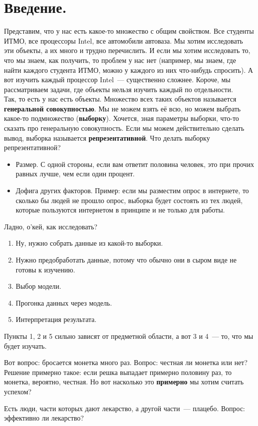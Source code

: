 \documentclass{article}
\begin{document}
    \section{Введение.}
    \begin{remark}
        Представим, что у нас есть какое-то множество с общим свойством. Все студенты ИТМО, все процессоры Intel, все автомобили автоваза. Мы хотим исследовать эти объекты, а их много и трудно перечислить. И если мы хотим исследовать то, что мы знаем, как получить, то проблем у нас нет (например, мы знаем, где найти каждого студента ИТМО, можно у каждого из них что-нибудь спросить). А вот изучить каждый процессор Intel~--- существенно сложнее. Короче, мы рассматриваем задачи, где объекты нельзя изучить каждый по отдельности.\\
        Так, то есть у нас есть объекты. Множество всех таких объектов называется \textbf{генеральной совокупностью}. Мы не можем взять её всю, но можем выбрать какое-то подмножество (\textbf{выборку}). Хочется, зная параметры выборки, что-то сказать про генеральную совокупность. Если мы можем действительно сделать вывод, выборка называется \textbf{репрезентативной}. Что делать выборку репрезентативной?
        \begin{itemize}
            \item Размер. С одной стороны, если вам ответит половина человек, это при прочих равных лучше, чем если один процент.
            \item Дофига других факторов. Пример: если мы разместим опрос в интернете, то сколько бы людей не прошло опрос, выборка будет состоять из тех людей, которые пользуются интернетом в принципе и не только для работы.
        \end{itemize}
        Ладно, о'кей, как исследовать?
        \begin{enumerate}
            \item Ну, нужно собрать данные из какой-то выборки.
            \item Нужно предобработать данные, потому что обычно они в сыром виде не готовы к изучению.
            \item Выбор модели.
            \item Прогонка данных через модель.
            \item Интерпретация результата.
        \end{enumerate}
        Пункты 1, 2 и 5 сильно зависят от предметной области, а вот 3 и 4~--- то, что мы будет изучать.
    \end{remark}
    \begin{example}
        Вот вопрос: бросается монетка много раз. Вопрос: честная ли монетка или нет? Решение примерно такое: если решка выпадает примерно половину раз, то монетка, вероятно, честная. Но вот насколько это \textbf{примерно} мы хотим считать успехом?
    \end{example}
    \begin{example}
        Есть люди, части которых дают лекарство, а другой части~--- плацебо. Вопрос: эффективно ли лекарство?
    \end{example}
\end{document}
